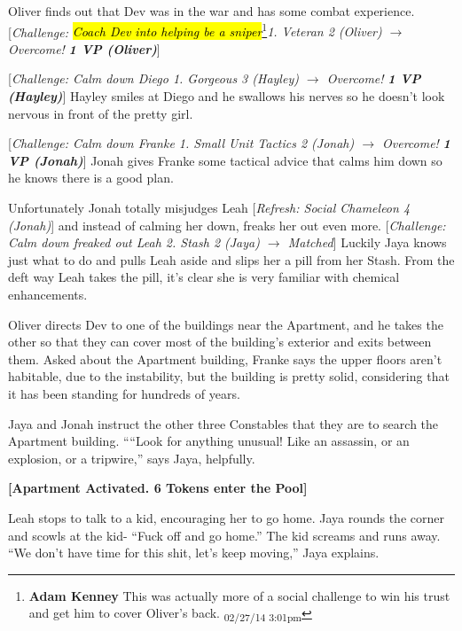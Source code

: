 Oliver finds out that Dev was in the war and has some combat experience. {[}\textit{Challenge: }\textit{\hl{Coach Dev into helping be a sniper}}\footnote{\textbf{Adam Kenney }This was actually more of a social challenge to win his trust and get him to cover Oliver's back. \textsubscript{02/27/14 3:01pm}}\textit{1. Veteran 2 (Oliver) $\rightarrow$ Overcome! }\textit{\textbf{1 VP (Oliver)}}{]}



{[}\textit{Challenge: Calm down Diego 1. Gorgeous 3 (Hayley) $\rightarrow$ Overcome! }\textit{\textbf{1 VP (Hayley)}}{]}  Hayley smiles at Diego and he swallows his nerves so he doesn't look nervous in front of the pretty girl.



{[}\textit{Challenge: Calm down Franke 1. Small Unit Tactics 2 (Jonah) $\rightarrow$ Overcome! }\textit{\textbf{1 VP (Jonah)}}{]} Jonah gives Franke some tactical advice that calms him down so he knows there is a good plan. 



Unfortunately Jonah totally misjudges Leah {[}\textit{Refresh: Social Chameleon 4 (Jonah)}{]} and instead of calming her down, freaks her out even more.  {[}\textit{Challenge: Calm down freaked out Leah 2. Stash 2 (Jaya) $\rightarrow$  Matched}{]} Luckily Jaya knows just what to do and pulls Leah aside and slips her a pill from her Stash.  From the deft way Leah takes the pill, it's clear she is very familiar with chemical enhancements.



Oliver directs Dev to one of the buildings near the Apartment, and he takes the other so that they can cover most of the building's exterior and exits between them.  Asked about the Apartment building, Franke says the upper floors aren't habitable, due to the instability, but the building is pretty solid, considering that it has been standing for hundreds of years.



Jaya and Jonah instruct the other three Constables that they are to search the Apartment building.  ````Look for anything unusual!  Like an assassin, or an explosion, or a tripwire,'' says Jaya, helpfully.  



\textbf{{[}Apartment Activated.  6 Tokens enter the Pool{]}}



Leah stops to talk to a kid, encouraging her to go home.  Jaya rounds the corner and scowls at the kid- ``Fuck off and go home.''  The kid screams and runs away.  ``We don't have time for this shit, let's keep moving,'' Jaya explains.



